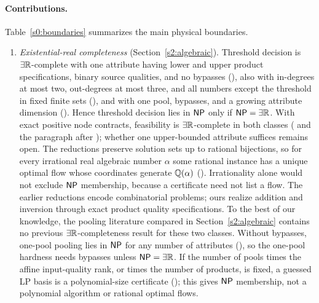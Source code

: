 \paragraph{Contributions.}
Table~\ref{s0:boundaries} summarizes the main physical boundaries.
\begin{enumerate}[label=(\arabic*),leftmargin=*]
\item \emph{Existential-real completeness} (Section~\ref{s2:algebraic}).
Threshold decision is $\exists\mathbb R$-complete with one attribute having lower
and upper product specifications, binary source qualities, and no
bypasses (), also with in-degrees at most two,
out-degrees at most three, and all numbers except the threshold in fixed
finite sets (), and with one pool, bypasses, and a
growing attribute dimension (). Hence threshold
decision lies in $\mathsf{NP}$ only if $\mathsf{NP}=\exists\mathbb R$. With exact positive node
contracts, feasibility is $\exists\mathbb R$-complete in both classes
( and the paragraph after );
whether one upper-bounded attribute suffices remains open. The
reductions preserve solution sets up to rational bijections, so for
every irrational real algebraic number $\alpha$ some rational instance
has a unique optimal flow whose coordinates generate $\mathbb Q(\alpha)$
(). Irrationality alone would not exclude
$\mathsf{NP}$ membership, because a certificate need not list a flow. The
earlier reductions \citep{alfaki2013-strong-formulations-for-the-pooling,
haugland2016-the-computational-complexity-of-the} encode combinatorial
problems; ours realize addition and inversion through exact product
quality specifications. To the best of our knowledge, the pooling
literature compared in Section~\ref{s2:algebraic} contains no previous
$\exists\mathbb R$-completeness result for these two classes. Without bypasses,
one-pool pooling lies in $\mathsf{NP}$ for any number of attributes
(), so the one-pool hardness needs bypasses unless
$\mathsf{NP}=\exists\mathbb R$. If the number of pools times the affine input-quality rank,
or times the number of products, is fixed, a guessed LP basis is a
polynomial-size certificate (); this gives $\mathsf{NP}$
membership, not a polynomial algorithm or rational optimal flows.


\end{enumerate}
